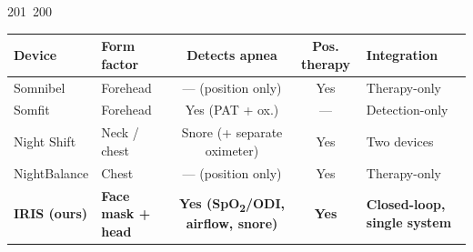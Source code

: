 201~200~\documentclass[10pt]{article}
\begin{document}
\begin{center}
\small
\begin{tabular}{@{}>{\raggedright\arraybackslash}p{3.3cm} >{\raggedright\arraybackslash}p{2.3cm} cc >{\raggedright\arraybackslash}p{3.6cm}@{}}
\toprule
\textbf{Device} & \textbf{Form factor} & \textbf{Detects apnea} & \textbf{Pos. therapy} & \textbf{Integration} \\
\midrule
Somnibel~\cite{forehead-rct} & Forehead & --- (position only) & Yes & Therapy-only \\
Somfit~\cite{somfit} & Forehead & Yes (PAT + ox.) & --- & Detection-only \\
Night Shift~\cite{nightshift} & Neck / chest & Snore (+ separate oximeter) & Yes & Two devices \\
NightBalance & Chest & --- (position only) & Yes & Therapy-only \\
\rowcolor{box!12}\textbf{IRIS (ours)} & \textbf{Face mask + head} & \textbf{Yes (SpO\textsubscript{2}/ODI, airflow, snore)} & \textbf{Yes} & \textbf{Closed-loop, single system} \\
\bottomrule
\end{tabular}
\end{center}

\end{document}
